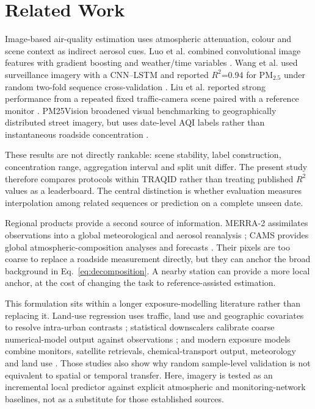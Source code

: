 \documentclass[review,12pt,authoryear]{elsarticle}
\newcommand{\PM}[1]{\ensuremath{\mathrm{PM}_{#1}}}
\newcommand{\pmfine}{\PM{2.5}}
\newcommand{\Rtwo}{\ensuremath{R^2}}
\begin{document}
\section{Related Work}

Image-based air-quality estimation uses atmospheric attenuation, colour and
scene context as indirect aerosol cues. Luo et al. combined convolutional image
features with gradient boosting and weather/time variables
\citep{luo2020cnn}. Wang et al. used surveillance imagery with a CNN--LSTM and
reported \Rtwo=0.94 for \pmfine{} under random two-fold sequence
cross-validation \citep{wang2024surveillance}. Liu et al. reported strong
performance from a repeated fixed traffic-camera scene paired with a reference
monitor \citep{liu2024trafficcamera}. PM25Vision broadened visual benchmarking
to geographically distributed street imagery, but uses date-level AQI labels
rather than instantaneous roadside concentration \citep{han2026pm25vision}.

These results are not directly rankable: scene stability, label construction,
concentration range, aggregation interval and split unit differ. The present
study therefore compares protocols within TRAQID rather than treating published
\Rtwo{} values as a leaderboard. The central distinction is whether evaluation
measures interpolation among related sequences or prediction on a complete
unseen date.

Regional products provide a second source of information. MERRA-2 assimilates
observations into a global meteorological and aerosol reanalysis
\citep{gelaro2017merra2}; CAMS provides global atmospheric-composition analyses
and forecasts \citep{inness2019cams}. Their pixels are too coarse to replace a
roadside measurement directly, but they can anchor the broad background in
Eq.~\ref{eq:decomposition}. A nearby station can provide a more local anchor,
at the cost of changing the task to reference-assisted estimation.

This formulation sits within a longer exposure-modelling literature rather
than replacing it. Land-use regression uses traffic, land use and geographic
covariates to resolve intra-urban contrasts \citep{hoek2008lur}; statistical
downscalers calibrate coarse numerical-model output against observations
\citep{berrocal2010downscaler}; and modern exposure models combine monitors,
satellite retrievals, chemical-transport output, meteorology and land use
\citep{di2019ensemble,wei2020stet}. Those studies also show why random
sample-level validation is not equivalent to spatial or temporal transfer.
Here, imagery is tested as an incremental local predictor against explicit
atmospheric and monitoring-network baselines, not as a substitute for those
established sources.
\end{document}
